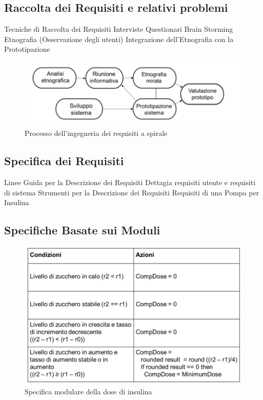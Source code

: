 \documentclass{article}
\begin{document}
	\subsection{Raccolta dei Requisiti e relativi problemi}
	Tecniche di Raccolta dei Requisiti
	Interviste
	Questionari
	Brain Storming
	Etnografia (Osservazione degli utenti)
	Integrazione dell’Etnografia con la Prototipazione
	\begin{figure}[h]
		\centering
		\includegraphics[scale=0.3]{14.diag_etnografia.png}
		\caption{Processo dell’ingegneria dei requisiti a spirale}
		\label{fig:im-14}
	\end{figure}
	\subsection{Specifica dei Requisiti}
	Linee Guida per la Descrizione dei Requisiti
	Dettagia requisiti utente e requisiti di sistema
	Strumenti per la Descrizione dei Requisiti
	Requisiti di una Pompa per Insulina
	\subsection{Specifiche Basate sui Moduli}
	\begin{figure}[h]
		\centering
		\includegraphics[scale=0.3]{15.spec_mod_ins.png}
		\caption{Specifica modulare della dose di insulina}
		\label{fig:im-15}
	\end{figure}
\end{document}

